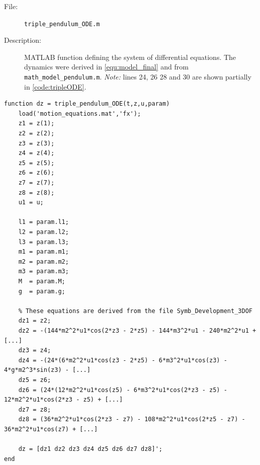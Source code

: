 \documentclass[a4paper,12pt]{article}
\begin{document}
\begin{description}
	\item[File:] \texttt{triple\_pendulum\_ODE.m}
	\item[Description:] MATLAB function defining the system of differential equations. The dynamics were derived in \autoref{equ:model_final} and from \texttt{math\_model\_pendulum.m}. \emph{Note:} lines 24, 26 28 and 30 are shown partially in \autoref{code:tripleODE}.
\end{description}
\begin{lstlisting}[label=code:tripleODE,caption=\texttt{triple\_pendulum\_ODE.m}]
function dz = triple_pendulum_ODE(t,z,u,param)
    load('motion_equations.mat','fx');
	z1 = z(1);
	z2 = z(2);
	z3 = z(3);
	z4 = z(4);
	z5 = z(5);
	z6 = z(6);
	z7 = z(7);
	z8 = z(8);
	u1 = u;

  	l1 = param.l1;
  	l2 = param.l2;
  	l3 = param.l3;
  	m1 = param.m1;
  	m2 = param.m2;
  	m3 = param.m3;
  	M  = param.M;
  	g  = param.g;

  	% These equations are derived from the file Symb_Development_3DOF
	dz1 = z2;
	dz2 = -(144*m2^2*u1*cos(2*z3 - 2*z5) - 144*m3^2*u1 - 240*m2^2*u1 + [...]
	dz3 = z4;
	dz4 = -(24*(6*m2^2*u1*cos(z3 - 2*z5) - 6*m3^2*u1*cos(z3) - 4*g*m2^3*sin(z3) - [...]
	dz5 = z6;
	dz6 = (24*(12*m2^2*u1*cos(z5) - 6*m3^2*u1*cos(2*z3 - z5) - 12*m2^2*u1*cos(2*z3 - z5) + [...]
	dz7 = z8;
	dz8 = (36*m2^2*u1*cos(2*z3 - z7) - 108*m2^2*u1*cos(2*z5 - z7) - 36*m2^2*u1*cos(z7) + [...]

	dz = [dz1 dz2 dz3 dz4 dz5 dz6 dz7 dz8]';
end
\end{lstlisting}
\end{document}

